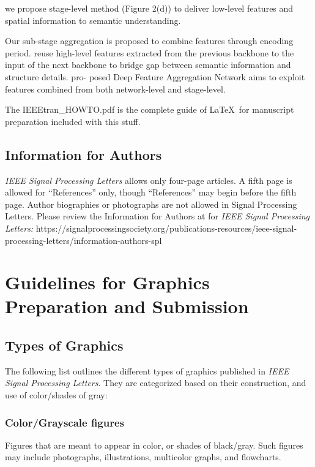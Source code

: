 \documentclass[journal]{IEEEtran}
\begin{document}
we propose stage-level method (Figure 2(d)) to deliver low-level features and spatial information to semantic understanding.

Our sub-stage aggregation is proposed to combine features through encoding period. reuse high-level features extracted from the previous backbone to the input of the next backbone to bridge gap between semantic information and structure details.
pro- posed Deep Feature Aggregation Network aims to exploit features combined from both network-level and stage-level.


The IEEEtran\_HOWTO.pdf is the complete guide of \LaTeX\ for manuscript preparation included with this stuff. 


\subsection{Information for Authors}

{\em IEEE Signal Processing Letters} allows only four-page articles. A fifth page is allowed for ``References'' only, though ``References'' may begin before the fifth page. Author biographies or photographs are not allowed in Signal Processing Letters. Please review the Information for Authors at for {\em IEEE Signal Processing Letters:} https://signalprocessingsociety.org/publications-resources/ieee-signal-processing-letters/information-authors-spl



\section{Guidelines for Graphics Preparation and Submission}
\label{sec:guidelines}

\subsection{Types of Graphics}
The following list outlines the different types of graphics published in 
{\it IEEE Signal Processing Letters}. They are categorized based on their construction, and use of 
color/shades of gray:

\subsubsection{Color/Grayscale figures}
{Figures that are meant to appear in color, or shades of black/gray. Such 
figures may include photographs, illustrations, multicolor graphs, and 
flowcharts.}
\end{document}
